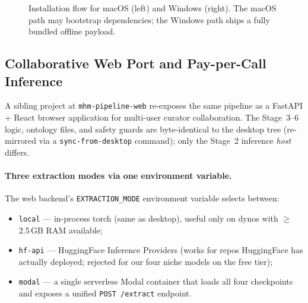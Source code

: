 \documentclass[12pt]{article}
\newcommand{\code}[1]{\texttt{#1}}
\begin{document}
\begin{figure}[H]
\caption{Installation flow for macOS (left) and Windows (right). The macOS path may bootstrap dependencies; the Windows path ships a fully bundled offline payload.}
\label{fig:install-flow}
\end{figure}

\subsection{Collaborative Web Port and Pay-per-Call Inference}
\label{sec:web-port-deployment}

A sibling project at \code{mhm-pipeline-web} re-exposes the same pipeline as a FastAPI + React browser application for multi-user curator collaboration. The Stage~3--6 logic, ontology files, and safety guards are byte-identical to the desktop tree (re-mirrored via a \code{sync-from-desktop} command); only the Stage~2 inference \emph{host} differs.

\paragraph{Three extraction modes via one environment variable.} The web backend's \code{EXTRACTION\_MODE} environment variable selects between:
\begin{itemize}
\item \code{local} --- in-process torch (same as desktop), useful only on dynos with $\geq$2.5\,GB RAM available;
\item \code{hf-api} --- HuggingFace Inference Providers (works for repos HuggingFace has actually deployed; rejected for our four niche models on the free tier);
\item \code{modal} --- a single serverless Modal container that loads all four checkpoints and exposes a unified \code{POST /extract} endpoint.
\end{itemize}
\end{document}
